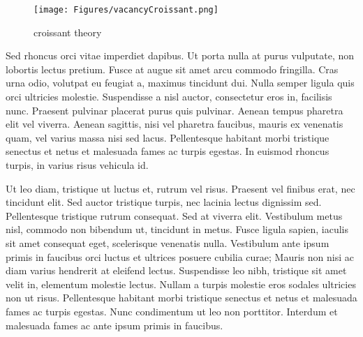     \begin{figure}
        \centering
        \texttt{[image: Figures/vacancyCroissant.png]}
        \caption{croissant theory}
        \label{fig:stm}
    \end{figure}

Sed rhoncus orci vitae imperdiet dapibus. Ut porta nulla at purus vulputate, non lobortis lectus pretium. Fusce at augue sit amet arcu commodo fringilla. Cras urna odio, volutpat eu feugiat a, maximus tincidunt dui. Nulla semper ligula quis orci ultricies molestie. Suspendisse a nisl auctor, consectetur eros in, facilisis nunc. Praesent pulvinar placerat purus quis pulvinar. Aenean tempus pharetra elit vel viverra. Aenean sagittis, nisi vel pharetra faucibus, mauris ex venenatis quam, vel varius massa nisi sed lacus. Pellentesque habitant morbi tristique senectus et netus et malesuada fames ac turpis egestas. In euismod rhoncus turpis, in varius risus vehicula id.

Ut leo diam, tristique ut luctus et, rutrum vel risus. Praesent vel finibus erat, nec tincidunt elit. Sed auctor tristique turpis, nec lacinia lectus dignissim sed. Pellentesque tristique rutrum consequat. Sed at viverra elit. Vestibulum metus nisl, commodo non bibendum ut, tincidunt in metus. Fusce ligula sapien, iaculis sit amet consequat eget, scelerisque venenatis nulla. Vestibulum ante ipsum primis in faucibus orci luctus et ultrices posuere cubilia curae; Mauris non nisi ac diam varius hendrerit at eleifend lectus. Suspendisse leo nibh, tristique sit amet velit in, elementum molestie lectus. Nullam a turpis molestie eros sodales ultricies non ut risus. Pellentesque habitant morbi tristique senectus et netus et malesuada fames ac turpis egestas. Nunc condimentum ut leo non porttitor. Interdum et malesuada fames ac ante ipsum primis in faucibus.